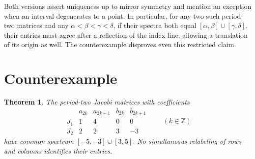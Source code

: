 \documentclass[11pt]{article}
\newtheorem{theorem}{Theorem}
\begin{document}
Both versions assert uniqueness up to mirror symmetry and mention an
exception when an interval degenerates to a point. In particular, for
any two such period-two matrices and any $\alpha<\beta<\gamma<\delta$,
if their spectra both equal
$[\alpha,\beta]\cup[\gamma,\delta]$, their entries must agree after a
reflection of the index line, allowing a translation of its origin
as well. The counterexample disproves even this restricted claim.

\clearpage
\section{Counterexample}

\begin{theorem}
The period-two Jacobi matrices with coefficients
\[
\begin{array}{c|cccc}
 & a_{2k} & a_{2k+1} & b_{2k} & b_{2k+1} \\ \hline
 J_1 & 1 & 4 & 0 & 0 \\
 J_2 & 2 & 2 & 3 & -3
\end{array}
\qquad (k\in\mathbb Z)
\]
have common spectrum $[-5,-3]\cup[3,5]$. No simultaneous relabeling
of rows and columns identifies their entries.
\end{theorem}
\end{document}
